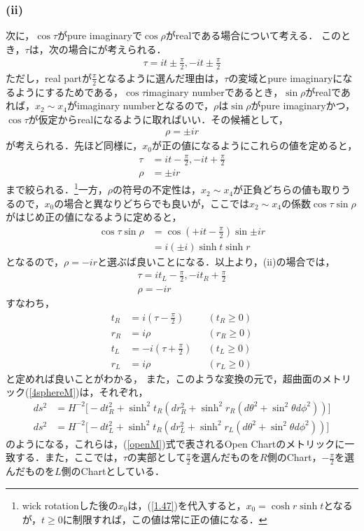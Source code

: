 \subsubsection{(ii)}
次に，$\cos\tau$がpure imaginaryで$\cos\rho$がrealである場合について考える．
このとき，$\tau$は，次の場合にが考えられる．
\begin{align}
  \tau=it\pm\frac{\pi}{2},-it\pm\frac{\pi}{2}
\end{align}
ただし，real partが$\frac{\pi}{2}$となるように選んだ理由は，$\tau$の変域とpure imaginaryになるようにするためである，$\cos\tau$imaginary numberであるとき，$\sin\rho$がrealであれば，$x_2 \sim x_4$がimaginary numberとなるので，$\rho$は$\sin\rho$がpure imaginaryかつ，$\cos\tau$が仮定からrealになるように取ればいい．その候補として，
\begin{align}
  \rho=\pm ir
\end{align}
が考えられる．先ほど同様に，$x_0$が正の値になるようにこれらの値を定めると，
\begin{align}
  \label{1.47}
  \tau&=it-\frac{\pi}{2},-it+\frac{\pi}{2} \\
  \label{1.48}
  \rho &= \pm ir
\end{align}
まで絞られる．\footnote{wick rotationした後の$x_0$は，(\ref{1.47})を代入すると，$x_0=\cosh{r}\sinh{t}$となるが，$t \geqslant 0$に制限すれば，この値は常に正の値になる．}一方，$\rho$の符号の不定性は，$x_2\sim x_4$が正負どちらの値も取りうるので，$x_0$の場合と異なりどちらでも良いが，ここでは$x_2\sim x_4$の係数$\cos\tau\sin\rho$がはじめ正の値になるように定めると，
\begin{align}
  \cos\tau\sin\rho&=\cos(+it-\frac{\pi}{2})\sin{\pm ir} \\
  &=i(\pm i)\sinh{t}\sinh{r}
\end{align}
となるので，$\rho=-ir$と選ぶば良いことになる．以上より，(ii)の場合では，
\begin{align}
  \label{1.49}
  \tau=it_{L}-\frac{\pi}{2},-it_{R}+\frac{\pi}{2} \\
  \label{1.59}
  \rho = - ir
\end{align}
すなわち，
\begin{align}
  t_{R}&=i(\tau-\frac{\pi}{2})& &(t_{R} \geqslant 0) \\
  r_{R}&=i\rho& &(r_{R} \geqslant 0) \\
  t_{L}&=-i(\tau+\frac{\pi}{2})& &(t_{L} \geqslant 0) \\
  r_{L}&=i\rho& &(r_{L} \geqslant 0)
\end{align}
と定めれば良いことがわかる，
また，このような変換の元で，超曲面のメトリック(\ref{4sphereM})は，それぞれ，
\begin{align}
  ds^2&=H^{-2}\biggr[-dt_{R}^2+\sinh^2{t_{R}}(dr_{R}^2+\sinh^2r_{R}(d\theta^2+\sin^2\theta d\phi^2))\biggr] \\
ds^2&=H^{-2}\biggr[-dt_{L}^2+\sinh^2{t_{R}}(dr_{L}^2+\sinh^2r_{L}(d\theta^2+\sin^2\theta d\phi^2))\biggr]
\end{align}
のようになる，これらは，(\ref{openM})式で表されるOpen Chartのメトリックに一致する．また，ここでは，$\tau$の実部として$\frac{\pi}{2}$を選んだものを$R$側のChart，$-\frac{\pi}{2}$を選んだものを$L$側のChartとしている．

